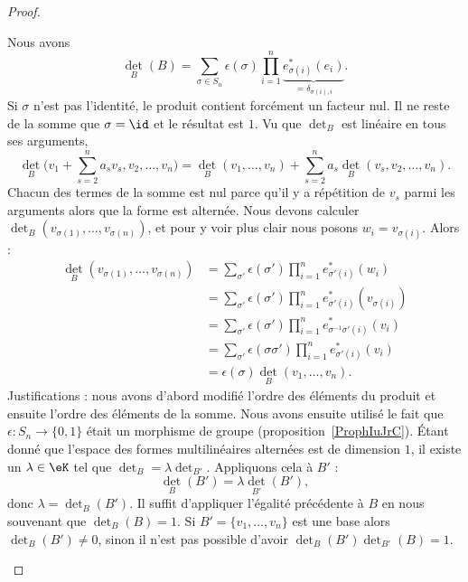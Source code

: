 \begin{proof}
\begin{subproof}
		\spitem[\ref{ITEMooNFJTooTqGoPr}]
		Nous avons
		\begin{equation}
			\det_B(B)=\sum_{\sigma\in S_n}\epsilon(\sigma)\prod_{i=1}^n\underbrace{e_{\sigma(i)}^*(e_i)}_{=\delta_{\sigma(i),i}}.
		\end{equation}
		Si \( \sigma\) n'est pas l'identité, le produit contient forcément un facteur nul. Il ne reste de la somme que \( \sigma=\id\) et le résultat est \( 1\).
		\spitem[\ref{ITEMooALRQooDvBzDQ}]
		Vu que \( \det_B\) est linéaire en tous ses arguments,
		\begin{equation}
			\det_B\big( v_1+\sum_{s=2}^na_sv_s,v_2,\ldots, v_n \big)=\det_B(v_1,\ldots, v_n)+\sum_{s=2}^na_s\det_B(v_s,v_2,\ldots, v_n).
		\end{equation}
		Chacun des termes de la somme est nul parce qu'il y a répétition de \( v_s\) parmi les arguments alors que la forme est alternée.
		\spitem[\ref{ITEMooQTTRooMbzqyW}]
		Nous devons calculer \( \det_B(v_{\sigma(1)},\ldots, v_{\sigma(n)})\), et pour y voir plus clair nous posons \( w_i=v_{\sigma(i)}\). Alors :
		\begin{subequations}
			\begin{align}
				\det_B(v_{\sigma(1)},\ldots, v_{\sigma(n)}) & =\sum_{\sigma'}\epsilon(\sigma')\prod_{i=1}^ne^*_{\sigma'(i)}(w_i)            \\
				                                            & =\sum_{\sigma'}\epsilon(\sigma')\prod_{i=1}^ne^*_{\sigma'(i)}(v_{\sigma(i)})  \\
				                                            & =\sum_{\sigma'}\epsilon(\sigma')\prod_{i=1}^ne^*_{\sigma^{-1}\sigma'(i)}(v_i) \\
				                                            & =\sum_{\sigma'}\epsilon(\sigma\sigma')\prod_{i=1}^ne^*_{\sigma'(i)}(v_i)      \\
				                                            & =\epsilon(\sigma)\det_B(v_1,\ldots, v_n).
			\end{align}
		\end{subequations}
		Justifications : nous avons d'abord modifié l'ordre des éléments du produit et ensuite l'ordre des éléments de la somme. Nous avons ensuite utilisé le fait que \( \epsilon\colon S_n\to \{ 0,1 \}\) était un morphisme de groupe (proposition~\ref{ProphIuJrC}).
		\spitem[\ref{ITEMooIPIDooTrerVF}]
		Étant donné que l'espace des formes multilinéaires alternées est de dimension \( 1\), il existe un \( \lambda\in \eK\) tel que \( \det_B=\lambda\det_{B'}\). Appliquons cela à \( B'\) :
		\begin{equation}
			\det_B(B')=\lambda\det_{B'}(B'),
		\end{equation}
		donc \( \lambda=\det_B(B')\).
		\spitem[\ref{ITEMooXKTAooXynFTE}]
		Il suffit d'appliquer l'égalité précédente à \( B\) en nous souvenant que \( \det_B(B)=1\).
		\spitem[\ref{ItemDWFLooDUePAf}]
		Si \( B'=\{ v_1,\ldots, v_n \}\) est une base alors \( \det_B(B')\neq 0\), sinon il n'est pas possible d'avoir \( \det_B(B')\det_{B'}(B)=1\).


\end{subproof}
\end{proof}
